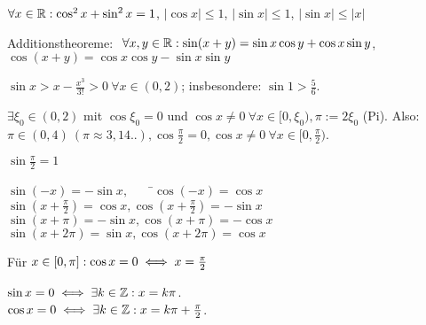 \documentclass[a4paper,oneside,DIV15,BCOR12mm]{scrbook}
\begin{document}
\begin{satz}
\begin{liste}
\item $\forall x \in \mathbb{R}: \cos^2 x + \sin^2 x = 1$, $|\cos x| \le 1$, $|\sin x| \le 1$, $|\sin x| \le |x|$
\item Additionstheoreme: $\ \forall x,y \in \mathbb{R}: \sin(x+y) = \sin x \cos y + \cos x \sin y$, $\cos(x+y) = \cos x \cos y - \sin x \sin y$
\item $\sin x > x - \frac{x^3}{3!} > 0 \ \forall x \in (0, 2)$; insbesondere: $\sin 1 > \frac{5}{6}$.
\item $\exists \xi_0 \in (0, 2)$ mit $\cos \xi_0=0$ und $\cos x \ne 0\ \forall x \in [0, \xi_0), \pi:=2\xi_0$ (Pi). Also: $\pi \in (0, 4)\ (\pi \approx 3,14..), \cos\frac{\pi}{2}=0, \cos x \ne 0 \ \forall x \in [0, \frac{\pi}{2})$.
\item $\sin\frac{\pi}{2}=1$
\item \begin{tabbing}
$\sin(-x)=-\sin x, $\ \ \ \ \=$\cos(-x)=\cos x$\\
$\sin(x+\frac{\pi}{2})=\cos x, $\>$\cos(x+\frac{\pi}{2})=-\sin x$\\
$\sin(x+\pi)=-\sin x, $\>$\cos(x+\pi)=-\cos x$\\
$\sin(x+2\pi)=\sin x, $\>$\cos(x+2\pi)=\cos x$
\end{tabbing}
\item Für $x \in [0, \pi]: \cos x = 0 \iff x=\frac{\pi}{2}$
\item $\sin x=0 \iff \exists k \in \mathbb{Z}: x = k\pi$. \\
	$\cos x=0 \iff \exists k \in \mathbb{Z}: x = k\pi+\frac{\pi}{2}$.
\end{liste}
\end{satz}
\end{document}
